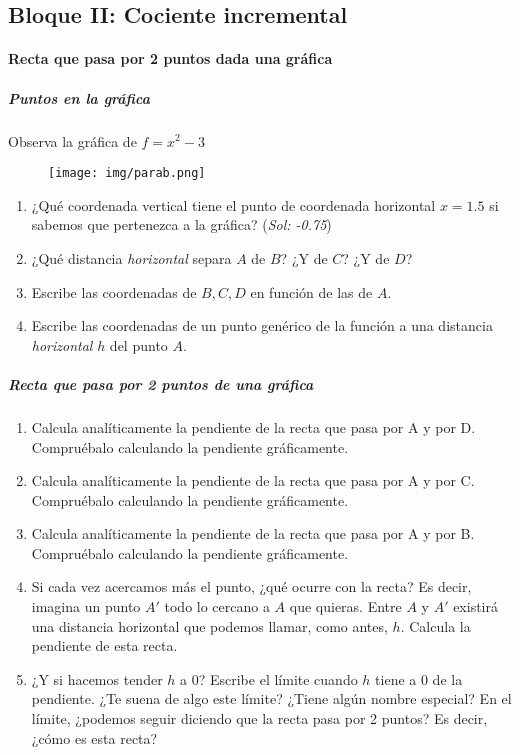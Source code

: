 \documentclass[palatino]{apuntesURJC}
\begin{document}
\subsection{Bloque II: Cociente incremental}

\paragraph{Recta que pasa por 2 puntos dada una gráfica}

\subparagraph{Puntos en la gráfica}
Observa la gráfica de $f=x^2-3$
\begin{figure}[h]
\centering
\texttt{[image: img/parab.png]}
\end{figure}

\begin{enumerate}
	\item ¿Qué coordenada vertical tiene el punto de coordenada horizontal $x=1.5$ si sabemos que pertenezca a la gráfica? (\textit{Sol: -0.75})
	\item ¿Qué distancia \textit{horizontal} separa $A$ de $B$? ¿Y de $C$? ¿Y de $D$?
	\item Escribe las coordenadas de $B,C,D$ en función de las de $A$.
	\item Escribe las coordenadas de un punto genérico de la función a una distancia \textit{horizontal} $h$ del punto $A$.
\end{enumerate}


\subparagraph{Recta que pasa por 2 puntos de una gráfica}
\begin{enumerate}
	\item Calcula analíticamente la pendiente de la recta que pasa por A y por D. Compruébalo calculando la pendiente gráficamente.
	\item Calcula analíticamente la pendiente de la recta que pasa por A y por C. Compruébalo calculando la pendiente gráficamente.
	\item Calcula analíticamente la pendiente de la recta que pasa por A y por B. Compruébalo calculando la pendiente gráficamente.
	\item Si cada vez acercamos más el punto, ¿qué ocurre con la recta? Es decir, imagina un punto $A'$ todo lo cercano a $A$ que quieras. 
	Entre $A$ y $A'$ existirá una distancia horizontal que podemos llamar, como antes, $h$. Calcula la pendiente de esta recta.
	\item ¿Y si hacemos tender $h$ a 0? Escribe el límite cuando $h$ tiene a 0 de la pendiente. ¿Te suena de algo este límite? ¿Tiene algún nombre especial? 
	\subitem En el límite, ¿podemos seguir diciendo que la recta pasa por 2 puntos? Es decir, ¿cómo es esta recta? 
\end{enumerate}
\end{document}
